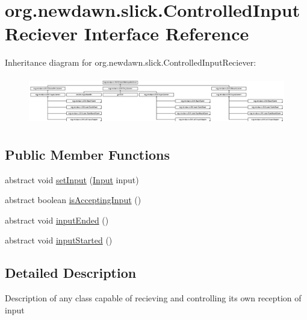 \hypertarget{interfaceorg_1_1newdawn_1_1slick_1_1_controlled_input_reciever}{}\section{org.\+newdawn.\+slick.\+Controlled\+Input\+Reciever Interface Reference}
\label{interfaceorg_1_1newdawn_1_1slick_1_1_controlled_input_reciever}
Inheritance diagram for org.\+newdawn.\+slick.\+Controlled\+Input\+Reciever\+:\begin{figure}[H]
\begin{center}
\leavevmode
\includegraphics[height=2.113208cm]{interfaceorg_1_1newdawn_1_1slick_1_1_controlled_input_reciever}
\end{center}
\end{figure}
\subsection*{Public Member Functions}
\begin{DoxyCompactItemize}
\item 
abstract void \mbox{\hyperlink{interfaceorg_1_1newdawn_1_1slick_1_1_controlled_input_reciever_ab838ca221a429b05c0b53aea9b4fe72f}{set\+Input}} (\mbox{\hyperlink{classorg_1_1newdawn_1_1slick_1_1_input}{Input}} input)
\item 
abstract boolean \mbox{\hyperlink{interfaceorg_1_1newdawn_1_1slick_1_1_controlled_input_reciever_a380186fb0c34c11c212b72fae8186dc7}{is\+Accepting\+Input}} ()
\item 
abstract void \mbox{\hyperlink{interfaceorg_1_1newdawn_1_1slick_1_1_controlled_input_reciever_a61c6cde7cbf28a6969cafe3ec4f1c121}{input\+Ended}} ()
\item 
abstract void \mbox{\hyperlink{interfaceorg_1_1newdawn_1_1slick_1_1_controlled_input_reciever_a718de21e9cd22f4c48ee87b5b8b32ed6}{input\+Started}} ()
\end{DoxyCompactItemize}


\subsection{Detailed Description}
Description of any class capable of recieving and controlling it\textquotesingle{}s own reception of input

